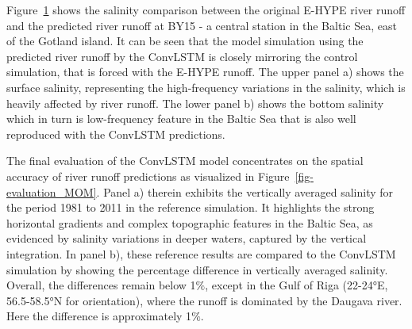\documentclass[
]{agujournal2019}
\begin{document}
Figure~\ref{fig-by15} shows the salinity comparison between the original
E-HYPE river runoff and the predicted river runoff at BY15 - a central
station in the Baltic Sea, east of the Gotland island. It can be seen
that the model simulation using the predicted river runoff by the
ConvLSTM is closely mirroring the control simulation, that is forced
with the E-HYPE runoff. The upper panel a) shows the surface salinity,
representing the high-frequency variations in the salinity, which is
heavily affected by river runoff. The lower panel b) shows the bottom
salinity which in turn is low-frequency feature in the Baltic Sea that
is also well reproduced with the ConvLSTM predictions.

\begin{figure}


\caption{\label{fig-by15}}

\end{figure}%

The final evaluation of the ConvLSTM model concentrates on the spatial
accuracy of river runoff predictions as visualized in
Figure~\ref{fig-evaluation_MOM}. Panel a) therein exhibits the
vertically averaged salinity for the period 1981 to 2011 in the
reference simulation. It highlights the strong horizontal gradients and
complex topographic features in the Baltic Sea, as evidenced by salinity
variations in deeper waters, captured by the vertical integration. In
panel b), these reference results are compared to the ConvLSTM
simulation by showing the percentage difference in vertically averaged
salinity. Overall, the differences remain below 1\(\%\), except in the
Gulf of Riga (22-24°E, 56.5-58.5°N for orientation), where the runoff is
dominated by the Daugava river. Here the difference is approximately
1\(\%\).
\end{document}
